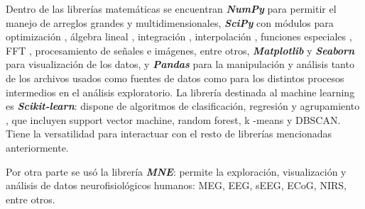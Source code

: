 \documentclass[../00_Main.tex]{subfiles}
\begin{document}
Dentro de las librerías matemáticas se encuentran \textbf{\textit{NumPy}} para permitir el manejo de arreglos grandes y multidimensionales, \textbf{\textit{SciPy}} con módulos para optimización , álgebra lineal , integración , interpolación , funciones especiales , FFT , procesamiento de señales e imágenes, entre otros, \textbf{\textit{Matplotlib}} y \textbf{\textit{Seaborn}} para visualización de los datos, y \textbf{\textit{Pandas}} para la manipulación y análisis tanto de los archivos usados como fuentes de datos como para los distintos procesos intermedios en el análisis exploratorio. La librería destinada al machine learning es \textbf{\textit{Scikit-learn}}: dispone de algoritmos de clasificación, regresión y agrupamiento , que incluyen support vector machine, random forest, k -means y DBSCAN. Tiene la versatilidad para interactuar con el resto de librerías mencionadas anteriormente.

Por otra parte se usó la librería \textbf{\textit{MNE}}: permite la exploración, visualización y análisis de datos neurofisiológicos humanos: MEG, EEG, sEEG, ECoG, NIRS, entre otros.

\biblio %
\end{document}
